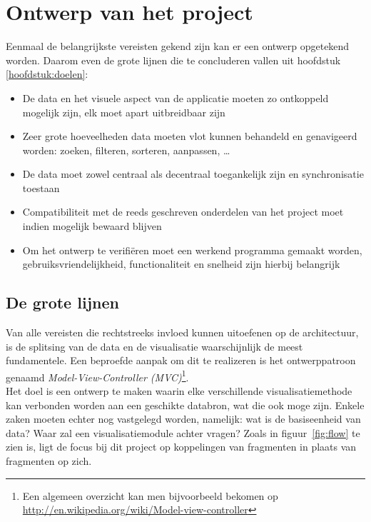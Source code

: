 \chapter{Ontwerp van het project}
\label{hoofdstuk:ontwerp}

Eenmaal de belangrijkste vereisten gekend zijn kan er een ontwerp opgetekend worden. Daarom even de grote lijnen die te concluderen vallen uit hoofdstuk \ref{hoofdstuk:doelen}:

\begin{itemize}
  \item De data en het visuele aspect van de applicatie moeten zo ontkoppeld mogelijk zijn, elk moet apart uitbreidbaar zijn
  \item Zeer grote hoeveelheden data moeten vlot kunnen behandeld en genavigeerd worden: zoeken, filteren, sorteren, aanpassen, \ldots
  \item De data moet zowel centraal als decentraal toegankelijk zijn en synchronisatie toestaan
  \item Compatibiliteit met de reeds geschreven onderdelen van het project moet indien mogelijk bewaard blijven
  \item Om het ontwerp te verifi\"eren moet een werkend programma gemaakt worden, gebruiksvriendelijkheid, functionaliteit en snelheid zijn hierbij belangrijk
\end{itemize}

\section{De grote lijnen}
Van alle vereisten die rechtstreeks invloed kunnen uitoefenen op de architectuur, is de splitsing van de data en de visualisatie waarschijnlijk de meest fundamentele. Een beproefde aanpak om dit te realizeren is het ontwerppatroon genaamd \emph{Model-View-Controller (MVC)}\footnote{Een algemeen overzicht kan men bijvoorbeeld bekomen op \url{http://en.wikipedia.org/wiki/Model-view-controller}}.\\

Het doel is een ontwerp te maken waarin elke verschillende visualisatiemethode kan verbonden worden aan een geschikte databron, wat die ook moge zijn. Enkele zaken moeten echter nog vastgelegd worden, namelijk: wat is de basiseenheid van data? Waar zal een visualisatiemodule achter vragen? Zoals in figuur~\ref{fig:flow} te zien is, ligt de focus bij dit project op koppelingen van fragmenten in plaats van fragmenten op zich.\\

